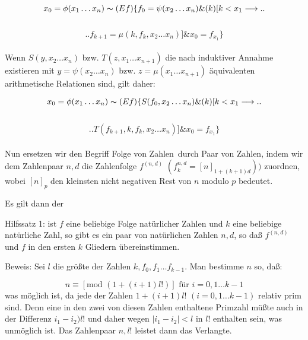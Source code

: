 \documentclass[draft]{scrartcl}
\newlength{\spacebetweenbreakedequations}
\newlength{\spaceafterbreakedequation}
\let\oldleft\left
\let\oldright\right
\def\left#1{%
	    \global\advance\bracketnum1\relax 
		\colorlet{temp}{.}%
		    \csname bracketcolor\the\bracketnum\endcsname
			\oldleft#1%
			    \color{temp}%
	}
\def\right#1{%
	    \colorlet{temp}{.}%
		\csname bracketcolor\the\bracketnum\endcsname
		    \oldright#1%
			\global\advance\bracketnum-1\relax
			    \color{temp}%
	}
\def\left#1{#1}
\def\right#1{#1}
\begin{document}
$$
x_0 = \phi\left(x_1 \dots x_n\right) \thicksim \left(Ef\right)\left\{ f_0 = \psi\left(x_2 \dots x_n\right) \& \left(k\right) \left[k < x_1 \longrightarrow\right.\right.
$$\\[\spacebetweenbreakedequations]
$$\left.\left. f_{k + 1} = \mu\left(k, f_k, x_2 \dots x_n\right)\right] \& x_0 = f_{x_1}\right\}
$$\\[\spaceafterbreakedequation]

Wenn $S\left(y, x_2 \dots x_n\right)$ bzw. $T\left(z, x_1 \dots x_{n + 1}\right)$ die 
nach induktiver Annahme existieren mit $y = \psi\left(x_2 \dots x_n\right)$ bzw. 
$z = \mu\left(x_1 \dots x_{n + 1}\right)$ äquivalenten arithmetische Relationen sind, gilt daher:

\begin{equation}
x_0 = \phi\left(x_1 \dots x_n\right) \thicksim \left(Ef\right) \left\{S\left(f_0, x_2 \dots x_n\right) \& \left(k\right)\left[k < x_1 \longrightarrow \right.\right.
\end{equation}\\[\spacebetweenbreakedequations]
\begin{equation*}
\left.\left.T\left(f_{k + 1}, k, f_k, x_2 \dots x_n\right)\right] \& x_0 = f_{x_1}\right\}
\end{equation*}\\[\spaceafterbreakedequation]

Nun ersetzen wir den Begriff \glqq Folge von Zahlen\grqq\ durch 
\glqq Paar von Zahlen\grqq, indem wir dem Zahlenpaar $n, d$ 
die Zahlenfolge $f^{\left(n, d\right)}$ $\left(f_k^{n, d} = \left[n\right]_{1 + \left(k + 1\right) d})\right)$
zuordnen, wobei $\left[n\right]_p$ den kleinsten nicht negativen Rest von $n$ modulo $p$ bedeutet.

Es gilt dann der

Hilfssatz 1: ist $f$ eine beliebige Folge natürlicher 
Zahlen und $k$ eine beliebige natürliche Zahl, so gibt es
ein paar von natürlichen Zahlen $n, d$, so daß $f^{\left(n, d\right)}$ 
und $f$ in den ersten $k$ Gliedern übereinstimmen.

Beweis: Sei $l$ die größte der Zahlen $k, f_0, f_1 \dots f_{k - 1}$. Man bestimme $n$ so, daß:

$$
n \equiv \left[\text{mod }\left(1 + \left(i + 1\right) l!\right)\right]\text{ für } i = 0, 1 \dots k - 1
		$$
		was möglich ist, da jede der Zahlen $1 + \left(i + 1\right) l!$ $\left(i = 0, 1 \dots k - 1\right)$
		relativ prim sind. Denn eine in den zwei von diesen Zahlen enthaltene Primzahl 
		müßte auch in der Differenz $i_1 - i_2)l!$ und daher wegen
$\left|i_1 - i_2\right| < l$ in $l!$ enthalten sein, was unmöglich
ist. Das Zahlenpaar $n, l!$ leistet dann das Verlangte.
\end{document}
